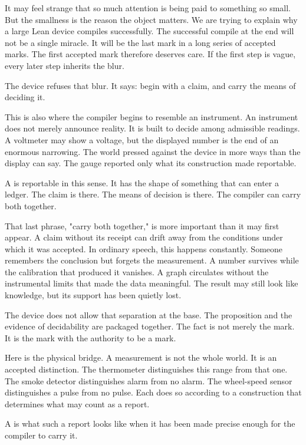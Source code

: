 It may feel strange that so much attention is being paid to something so small.
But the smallness is the reason the object matters. We are trying to explain
why a large Lean device compiles successfully. The successful compile at the
end will not be a single miracle. It will be the last mark in a long series of
accepted marks. The first accepted mark therefore deserves care. If the first
step is vague, every later step inherits the blur.

The device refuses that blur. It says: begin with a claim, and carry the means
of deciding it.

This is also where the compiler begins to resemble an instrument. An instrument
does not merely announce reality. It is built to decide among admissible
readings. A voltmeter may show a voltage, but the displayed number is the end
of an enormous narrowing. The world pressed against the device in more ways
than the display can say. The gauge reported only what its construction made
reportable.

A  is reportable in this sense. It has the shape of something that
can enter a ledger. The claim is there. The means of decision is there. The
compiler can carry both together.

That last phrase, "carry both together," is more important than it may first
appear. A claim without its receipt can drift away from the conditions under
which it was accepted. In ordinary speech, this happens constantly. Someone
remembers the conclusion but forgets the measurement. A number survives while
the calibration that produced it vanishes. A graph circulates without the
instrumental limits that made the data meaningful. The result may still look
like knowledge, but its support has been quietly lost.

The device does not allow that separation at the base. The proposition and the
evidence of decidability are packaged together. The fact is not merely the
mark. It is the mark with the authority to be a mark.

Here is the physical bridge. A measurement is not the whole world. It is an
accepted distinction. The thermometer distinguishes this range from that one.
The smoke detector distinguishes alarm from no alarm. The wheel-speed sensor
distinguishes a pulse from no pulse. Each does so according to a construction
that determines what may count as a report.

A  is what such a report looks like when it has been made precise
enough for the compiler to carry it.

